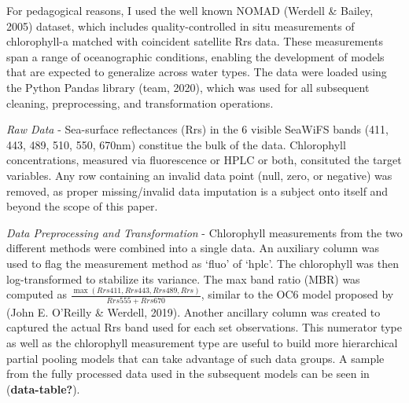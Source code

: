 \documentclass[
]{agujournal2019}
\begin{document}
For pedagogical reasons, I used the well known NOMAD (Werdell \& Bailey,
2005) dataset, which includes quality-controlled in situ measurements of
chlorophyll-a matched with coincident satellite Rrs data. These
measurements span a range of oceanographic conditions, enabling the
development of models that are expected to generalize across water
types. The data were loaded using the Python Pandas library (team,
2020), which was used for all subsequent cleaning, preprocessing, and
transformation operations.

\emph{Raw Data} - Sea-surface reflectances (Rrs) in the 6 visible
SeaWiFS bands (411, 443, 489, 510, 550, 670nm) constitue the bulk of the
data. Chlorophyll concentrations, measured via fluorescence or HPLC or
both, consituted the target variables. Any row containing an invalid
data point (null, zero, or negative) was removed, as proper
missing/invalid data imputation is a subject onto itself and beyond the
scope of this paper.

\emph{Data Preprocessing and Transformation} - Chlorophyll measurements
from the two different methods were combined into a single data. An
auxiliary column was used to flag the measurement method as `fluo' of
`hplc'. The chlorophyll was then log-transformed to stabilize its
variance. The max band ratio (MBR) was computed as
\(\frac {\max(Rrs411, Rrs443, Rrs489, Rrs)}{Rrs555 + Rrs670}\), similar
to the OC6 model proposed by (John E. O'Reilly \& Werdell, 2019).
Another ancillary column was created to captured the actual Rrs band
used for each set observations. This numerator type as well as the
chlorophyll measurement type are useful to build more hierarchical
partial pooling models that can take advantage of such data groups. A
sample from the fully processed data used in the subsequent models can
be seen in (\textbf{data-table?}).
\end{document}
